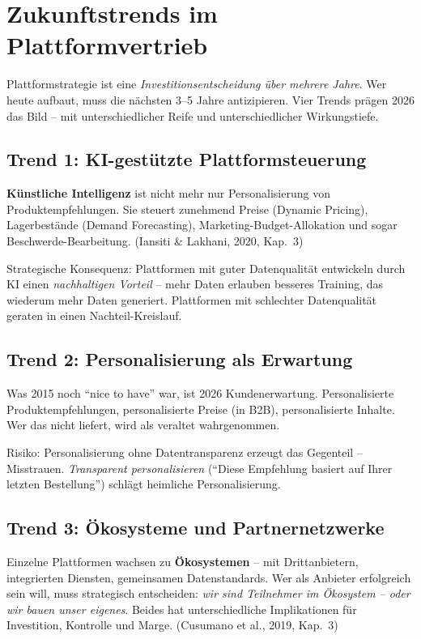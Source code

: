 \documentclass[11pt,a4paper,oneside]{article}
\newcommand{\fachbegriff}[1]{\textbf{#1}}
\newcommand{\quelle}[1]{{\footnotesize\color{lpGray}(#1)}}
\begin{document}
\section{Zukunftstrends im Plattformvertrieb}

Plattformstrategie ist eine \emph{Investitions­entscheidung über mehrere Jahre}. Wer heute aufbaut, muss die nächsten 3--5 Jahre antizipieren. Vier Trends prägen 2026 das Bild -- mit unterschiedlicher Reife und unterschiedlicher Wirkungstiefe.

\subsection{Trend 1: KI-gestützte Plattformsteuerung}

\fachbegriff{Künstliche Intelligenz} ist nicht mehr nur Personalisierung von Produktempfehlungen. Sie steuert zunehmend Preise (Dynamic Pricing), Lagerbestände (Demand Forecasting), Marketing-Budget-Allokation und sogar Beschwerde-Bearbeitung. \quelle{Iansiti \& Lakhani, 2020, Kap.~3}

Strategische Konsequenz: Plattformen mit guter Datenqualität entwickeln durch KI einen \emph{nachhaltigen Vorteil} -- mehr Daten erlauben besseres Training, das wiederum mehr Daten generiert. Plattformen mit schlechter Datenqualität geraten in einen Nachteil-Kreislauf.

\subsection{Trend 2: Personalisierung als Erwartung}

Was 2015 noch ``nice to have'' war, ist 2026 Kunden­erwartung. Personalisierte Produktempfehlungen, personalisierte Preise (in B2B), personalisierte Inhalte. Wer das nicht liefert, wird als veraltet wahrgenommen.

Risiko: Personalisierung ohne Datentransparenz erzeugt das Gegenteil -- Misstrauen. \emph{Transparent personalisieren} (``Diese Empfehlung basiert auf Ihrer letzten Bestellung'') schlägt heimliche Personalisierung.

\subsection{Trend 3: Ökosysteme und Partnernetzwerke}

Einzelne Plattformen wachsen zu \fachbegriff{Ökosystemen} -- mit Drittanbietern, integrierten Diensten, gemeinsamen Datenstandards. Wer als Anbieter erfolgreich sein will, muss strategisch entscheiden: \emph{wir sind Teilnehmer im Ökosystem -- oder wir bauen unser eigenes}. Beides hat unterschiedliche Implikationen für Investition, Kontrolle und Marge. \quelle{Cusumano et al., 2019, Kap.~3}
\end{document}
